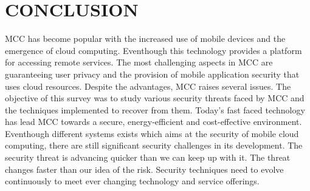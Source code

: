 \documentclass[10pt,a4paper,journal]{IEEEtran}
\begin{document}
\section{CONCLUSION}
 MCC has become popular with the increased use of mobile devices and the emergence of
cloud computing. Eventhough this technology provides a platform for accessing remote services. The most challenging aspects in MCC are guaranteeing user privacy and the provision
of mobile application security that uses cloud resources. Despite the advantages, MCC raises
several issues. The objective of this survey was to study various security threats faced by
MCC and the techniques implemented to recover from them. Today's
fast faced technology has lead MCC towards a secure, energy-efficient and cost-effective environment. Eventhough different systems exists which aims at the security of mobile cloud
computing, there are still significant security challenges in its development. The security
threat is advancing quicker than we can keep up with it. The threat changes faster than
our idea of the risk. Security techniques need to evolve continuously to meet ever changing
technology and service offerings.
\end{document}
